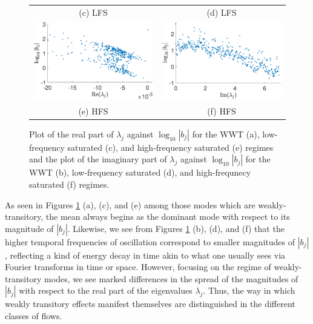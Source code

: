 \documentclass[a4paper,11pt]{article}
\begin{document}
\begin{figure}[!ht]
\begin{tabular}{cc}
(c) LFS & (d) LFS\\
\includegraphics[width=.525\textwidth]{bvals_vs_real_lam_hfforce_K_256_Lx_128_tf_2e4} &\hspace{-25pt} \includegraphics[width=.525\textwidth]{bvals_vs_imag_lam_hfforce_K_256_Lx_128_tf_2e4}\\
(e) HFS & (f) HFS
\end{tabular}
\caption{Plot of the real part of $\lambda_{j}$ against $\log_{10}|b_{j}|$ for the WWT (a), low-frequency saturated (c), and high-frequency saturated (e) regimes and the plot of the imaginary part of $\lambda_{j}$ against $\log_{10}|b_{j}|$  for the WWT (b), low-frequency saturated (d), and high-frequnecy saturated (f) regimes.}
\label{fig:wkosccomp}
\end{figure}
As seen in  Figures \ref{fig:wkosccomp} (a), (c), and (e) among those modes which are weakly-transitory, the mean always begins as the dominant mode with respect to its magnitude of $|b_{j}|$.  Likewise, we see from Figures \ref{fig:wkosccomp} (b), (d), and (f) that the higher temporal frequencies of oscillation correspond to smaller magnitudes of $|b_{j}|$, reflecting a kind of energy decay in time akin to what one usually sees via Fourier transforms in time or space.  However, focusing on the regime of weakly-transitory modes, we see marked differences in the spread of the magnitudes of $|b_{j}|$ with respect to the real part of the eigenvalues $\lambda_{j}$.  Thus, the way in which weakly transitory effects manifest themselves are distinguished in the different classes of flows.  
\end{document}
